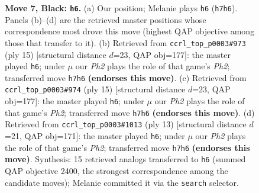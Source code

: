 \documentclass[11pt]{article}
\begin{document}
\begin{figure}[p]
\caption{\textbf{Move 7, Black: \texttt{h6}.} (a) Our position; Melanie plays \texttt{h6} (\texttt{h7h6}). Panels (b)--(d) are the retrieved master positions whose correspondence most drove this move (highest QAP objective among those that transfer to it). (b) Retrieved from \texttt{ccrl\_top\_p0003\#973} (ply 15) [structural distance $d$=23, QAP obj=177]: the master played \texttt{h6}; under $\mu$ our \emph{Ph2} plays the role of that game's \emph{Ph2}; transferred move \texttt{h7h6} \textbf{(endorses this move)}. (c) Retrieved from \texttt{ccrl\_top\_p0003\#974} (ply 15) [structural distance $d$=23, QAP obj=177]: the master played \texttt{h6}; under $\mu$ our \emph{Ph2} plays the role of that game's \emph{Ph2}; transferred move \texttt{h7h6} \textbf{(endorses this move)}. (d) Retrieved from \texttt{ccrl\_top\_p0003\#1013} (ply 13) [structural distance $d$=21, QAP obj=171]: the master played \texttt{h6}; under $\mu$ our \emph{Ph2} plays the role of that game's \emph{Ph2}; transferred move \texttt{h7h6} \textbf{(endorses this move)}. Synthesis: 15 retrieved analogs transferred to \texttt{h6} (summed QAP objective 2400, the strongest correspondence among the candidate moves); Melanie committed it via the \texttt{search} selector.}
\label{fig:thought-m13}
\end{figure}

\clearpage
\end{document}

